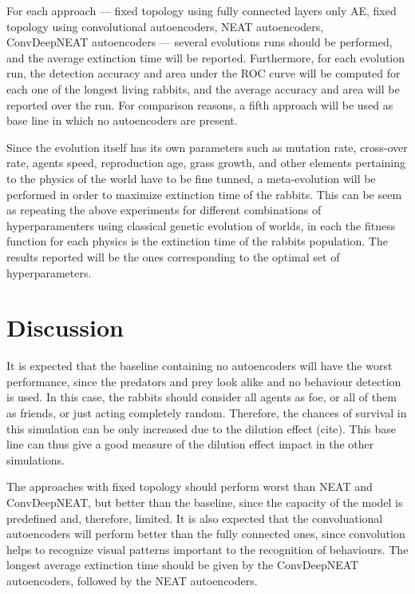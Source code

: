 \documentclass[letterpaper]{article}
\numberwithin{equation}{section}
\numberwithin{theorem}{section}
\numberwithin{lemma}{section}
\numberwithin{df}{section}
\begin{document}
For each approach --- fixed topology using fully connected layers only AE, fixed topology using convolutional autoencoders, NEAT autoencoders, ConvDeepNEAT autoencoders --- several evolutions runs should be performed, and the average extinction time will be reported. Furthermore, for each evolution run, the detection accuracy and area under the ROC curve will be computed for each one of the longest living rabbits, and the average accuracy and area will be reported over the run. For comparison reasons, a fifth approach will be used as base line in which no autoencoders are present.

Since the evolution itself has its own parameters such as mutation rate, cross-over rate, agents speed, reproduction age, grass growth, and other elements pertaining to the physics of the world have to be fine tunned, a meta-evolution will be performed in order to maximize extinction time of the rabbits. This can be seem as repeating the above experiments for different combinations of hyperparamenters using classical genetic evolution of worlds, in each the fitness function for each physics is the extinction time of the rabbits population. The results reported will be the ones corresponding to the optimal set of hyperparameters.
 

\section{Discussion}

It is expected that the baseline containing no autoencoders will have  the worst performance, since the predators and prey look alike and no behaviour detection is used. In this case, the rabbits should consider all agents as foe, or all of them as friends, or just acting completely random. Therefore, the chances of survival in this simulation can be only increased due to the dilution effect (cite). This base line can thus give a good measure of the dilution effect impact in the other simulations.

The approaches with fixed topology should perform worst than NEAT and ConvDeepNEAT, but better than the baseline, since the capacity of the model is predefined and, therefore, limited. It is also expected that the convoluational autoencoders will perform better than the fully connected ones, since convolution helps to recognize visual patterns important to the recognition of behaviours. The longest average extinction time should be given by the ConvDeepNEAT autoencoders, followed by the NEAT autoencoders. 
\end{document}
